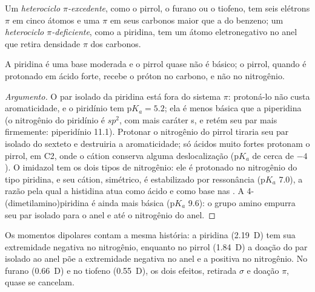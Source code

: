 \begin{definition}\label{def:b3:heterocycles:pi-character}
Um \emph{heterociclo $\pi$-excedente}, como o
pirrol, o furano ou o tiofeno, tem seis elétrons $\pi$ em cinco átomos e uma  $\pi$ em seus carbonos maior que a do benzeno; um \emph{heterociclo
$\pi$-deficiente}, como a piridina, tem um
átomo eletronegativo no anel que retira densidade $\pi$ dos carbonos.
\end{definition}

\begin{proposition}[Basicidade]\label{prop:b3:heterocycles:basicity}
A piridina é uma base moderada e o pirrol quase não é básico; o pirrol, quando é
protonado em ácido forte, recebe o próton no carbono, e não no nitrogênio.
\end{proposition}

\begin{proof}[Argumento]
O par isolado da piridina está fora do sistema $\pi$: protoná-lo não custa
aromaticidade, e o piridínio tem $\mathrm pK_a = 5.2$; ela é menos básica que a piperidina
(o nitrogênio do piridínio é $sp^2$, com mais caráter s, e retém seu par mais
firmemente: piperidínio 11.1). Protonar o nitrogênio do pirrol tiraria seu par isolado
do sexteto e destruiria a aromaticidade; só ácidos muito fortes
protonam o pirrol, em C2, onde o cátion conserva alguma deslocalização
($\mathrm pK_a$ de cerca de $-4$). O imidazol tem os dois tipos de nitrogênio: ele é protonado no
nitrogênio do tipo piridina, e seu cátion, simétrico, é estabilizado por ressonância ($\mathrm pK_a$
7.0), a razão pela qual a histidina atua como ácido e como base nas .
A 4-(dimetilamino)piridina é ainda mais básica ($\mathrm pK_a$ 9.6): o grupo amino empurra
seu par isolado para o anel e até o nitrogênio do anel.
\end{proof}

Os momentos dipolares contam a mesma história: a piridina (\qty{2.19}{D}) tem sua extremidade negativa
no nitrogênio, enquanto no pirrol (\qty{1.84}{D}) a doação do par isolado ao anel
põe a extremidade negativa no anel e a positiva no nitrogênio. No furano
(\qty{0.66}{D}) e no tiofeno (\qty{0.55}{D}), os dois efeitos, retirada $\sigma$ e doação $\pi$, quase se
cancelam.

